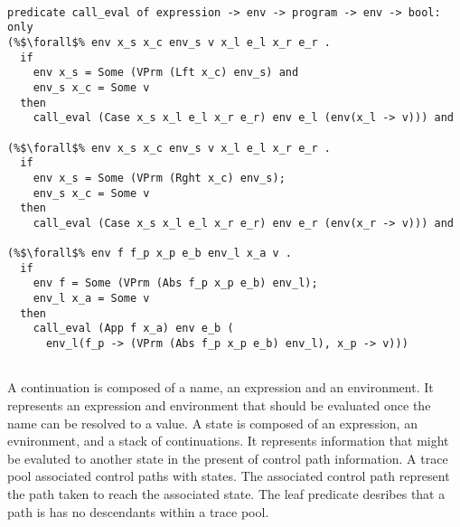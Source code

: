 \documentclass{article}
\begin{document}
\begin{lstlisting}[language=logic, style=codestyle1, escapechar=\%]

predicate call_eval of expression -> env -> program -> env -> bool:
only
(%$\forall$% env x_s x_c env_s v x_l e_l x_r e_r .
  if
    env x_s = Some (VPrm (Lft x_c) env_s) and
    env_s x_c = Some v
  then
    call_eval (Case x_s x_l e_l x_r e_r) env e_l (env(x_l -> v))) and

(%$\forall$% env x_s x_c env_s v x_l e_l x_r e_r .
  if 
    env x_s = Some (VPrm (Rght x_c) env_s); 
    env_s x_c = Some v
  then
    call_eval (Case x_s x_l e_l x_r e_r) env e_r (env(x_r -> v))) and

(%$\forall$% env f f_p x_p e_b env_l x_a v .
  if 
    env f = Some (VPrm (Abs f_p x_p e_b) env_l); 
    env_l x_a = Some v
  then
    call_eval (App f x_a) env e_b (
      env_l(f_p -> (VPrm (Abs f_p x_p e_b) env_l), x_p -> v)))
  

\end{lstlisting}
  

A continuation is composed of a name, an expression and an environment.  It represents an
expression and environment that should be evaluated once the name can be resolved to a value.
A state is composed of an expression, an evnironment, and a stack of continuations.
It represents information that might be evaluted to another state in the present of control
path information.  A trace pool associated control paths with states.  The associated control
path represent the path taken to reach the associated state. The leaf predicate desribes that a
path is has no descendants within a trace pool.  
\end{document}
